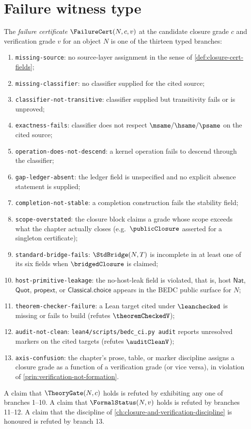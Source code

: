 \section{Failure witness type}
\label{sec:acceptance-failure-cert}

\begin{definition}
\label{def:acceptance-failure-cert}
The \emph{failure certificate} $\FailureCert(N, c, v)$ at the candidate closure grade $c$ and verification grade $v$ for an object $N$ is one of the thirteen typed branches:
\begin{enumerate}
  \item \texttt{missing-source}: no source-layer assignment in the sense of \autoref{def:closure-cert-fields};
  \item \texttt{missing-classifier}: no classifier supplied for the cited source;
  \item \texttt{classifier-not-transitive}: classifier supplied but transitivity fails or is unproved;
  \item \texttt{exactness-fails}: classifier does not respect $\msame / \hsame / \psame$ on the cited source;
  \item \texttt{operation-does-not-descend}: a kernel operation fails to descend through the classifier;
  \item \texttt{gap-ledger-absent}: the ledger field is unspecified and no explicit absence statement is supplied;
  \item \texttt{completion-not-stable}: a completion construction fails the stability field;
  \item \texttt{scope-overstated}: the closure block claims a grade whose scope exceeds what the chapter actually closes (e.g.\ $\publicClosure$ asserted for a singleton certificate);
  \item \texttt{standard-bridge-fails}: $\StdBridge(N,T)$ is incomplete in at least one of its six fields when $\bridgedClosure$ is claimed;
  \item \texttt{host-primitive-leakage}: the no-host-leak field is violated, that is, host $\mathsf{Nat}$, $\mathsf{Quot}$, $\mathsf{propext}$, or $\mathsf{Classical.choice}$ appears in the BEDC public surface for $N$;
  \item \texttt{theorem-checker-failure}: a Lean target cited under $\verb|\leanchecked|$ is missing or fails to build (refutes $\theoremCheckedV$);
  \item \texttt{audit-not-clean}: \texttt{lean4/scripts/bedc\_ci.py audit} reports unresolved markers on the cited targets (refutes $\auditCleanV$);
  \item \texttt{axis-confusion}: the chapter's prose, table, or marker discipline assigns a closure grade as a function of a verification grade (or vice versa), in violation of \autoref{prin:verification-not-formation}.
\end{enumerate}
A claim that $\TheoryGate(N, c)$ holds is refuted by exhibiting any one of branches 1--10. A claim that $\FormalStatus(N, v)$ holds is refuted by branches 11--12. A claim that the discipline of \autoref{ch:closure-and-verification-discipline} is honoured is refuted by branch 13.
\end{definition}

